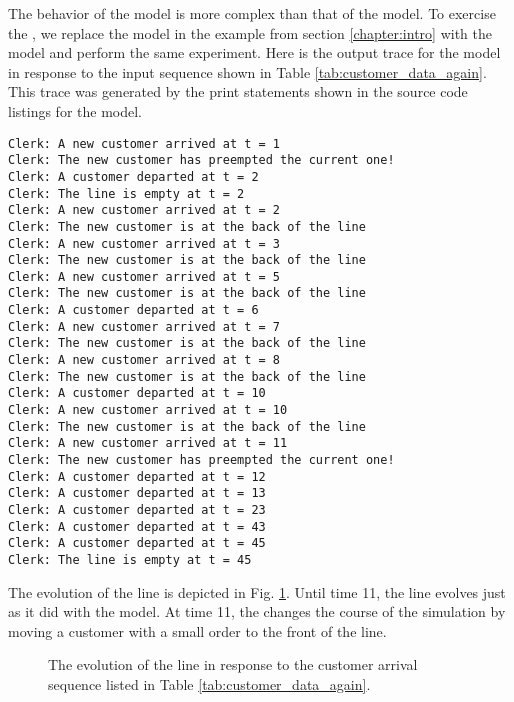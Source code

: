 The behavior of the  model is more complex than that of the  model. To exercise the , we replace the  model in the example from section \ref{chapter:intro} with the  model and perform the same experiment. Here is the output trace for the  model in response to the input sequence shown in Table \ref{tab:customer_data_again}. This trace was generated by the print statements shown in the source code listings for the  model.
\begin{verbatim}
Clerk: A new customer arrived at t = 1
Clerk: The new customer has preempted the current one!
Clerk: A customer departed at t = 2
Clerk: The line is empty at t = 2
Clerk: A new customer arrived at t = 2
Clerk: The new customer is at the back of the line
Clerk: A new customer arrived at t = 3
Clerk: The new customer is at the back of the line
Clerk: A new customer arrived at t = 5
Clerk: The new customer is at the back of the line
Clerk: A customer departed at t = 6
Clerk: A new customer arrived at t = 7
Clerk: The new customer is at the back of the line
Clerk: A new customer arrived at t = 8
Clerk: The new customer is at the back of the line
Clerk: A customer departed at t = 10
Clerk: A new customer arrived at t = 10
Clerk: The new customer is at the back of the line
Clerk: A new customer arrived at t = 11
Clerk: The new customer has preempted the current one!
Clerk: A customer departed at t = 12
Clerk: A customer departed at t = 13
Clerk: A customer departed at t = 23
Clerk: A customer departed at t = 43
Clerk: A customer departed at t = 45
Clerk: The line is empty at t = 45
\end{verbatim}

The evolution of the  line is depicted in Fig. \ref{fig:clerk2_line}. Until time 11, the line evolves just as it did with the  model. At time 11, the  changes the course of the simulation by moving a customer with a small order to the front of the line.
\begin{figure}[ht]
\centering
{}
\caption{The evolution of the  line in response to the customer arrival sequence listed in Table \ref{tab:customer_data_again}.}
\label{fig:clerk2_line}
\end{figure}
